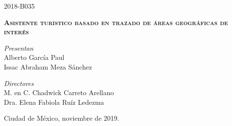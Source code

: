 \begin{titlepage}
\begin{minipage}[c][0.6\textheight][t]{0.65\textwidth}
\begin{center}
	{
     \LARGE{2018-B035\\}
    }
    \vspace{0.5cm}

    {
     \scshape {\LARGE \textbf{Asistente turístico basado en trazado de áreas geográficas de interés}}
    }
    \vspace{2.5cm}
    
   
    \huge \textit{Presentan}\\[8pt]
    \Large {Alberto García Paul \\[0.2cm]}
	\Large {Issac Abraham Meza Sánchez \\[2.5cm]}

   {\huge \textit{Directores}}                 \\[0.5cm]
  { \Large M. en C. Chadwick Carreto Arellano\\[0.2cm]  \Large Dra. Elena Fabiola Ruíz Ledezma}
    \vspace{4.5cm}
     \begin{flushright}
      {Ciudad de México, }{}{noviembre de 2019.}
 \end{flushright}
  \end{center}
\end{minipage}

\end{titlepage}

